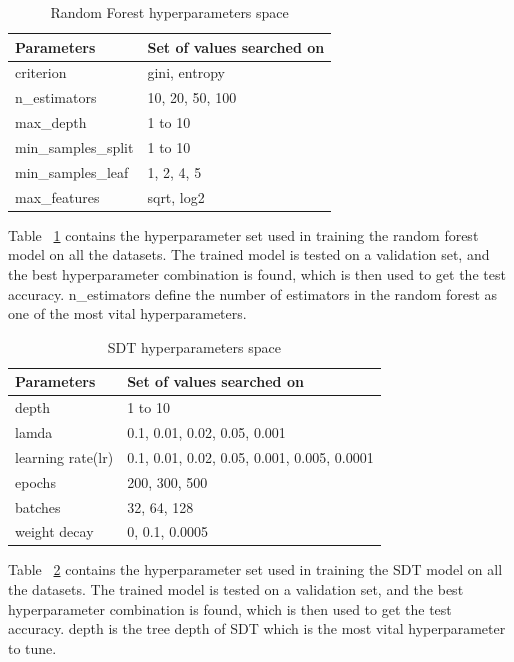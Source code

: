 \documentclass{article} %
\renewcommand{\>}{{\rightarrow}}
\renewcommand{\=}{\stackrel{\triangle}{=}}
\newcommand{\0}{{\mathbf 0}}
\begin{document}
\begin{table}[htbp]
\caption{Random Forest hyperparameters space}
\label{rf-hyp}
\begin{center}
\begin{tabular}{|p{4cm}|p{8cm}|}
\hline
Parameters &Set of values searched on\\
 \hline
criterion &gini, entropy\\
n\_estimators &10, 20, 50, 100\\
max\_depth &1 to 10\\
min\_samples\_split &1 to 10\\
min\_samples\_leaf &1, 2, 4, 5\\
max\_features &sqrt, log2\\
\hline 
\end{tabular}
\end{center}
\end{table}

Table ~\ref{rf-hyp} contains the hyperparameter set used in training the random forest model on all the datasets. The trained model is tested on a validation set, and the best hyperparameter combination is found, which is then used to get the test accuracy. n\_estimators define the number of estimators in the random forest as one of the most vital hyperparameters.

\begin{table}[htbp]
\caption{SDT hyperparameters space}
\label{sdt-hyp}
\begin{center}
\begin{tabular}{|p{4cm}|p{8cm}|}
\hline
Parameters &Set of values searched on\\
 \hline
depth &1 to 10\\
lamda &0.1, 0.01, 0.02, 0.05, 0.001\\
learning rate(lr)     &0.1, 0.01, 0.02, 0.05, 0.001, 0.005, 0.0001\\
epochs   &200, 300, 500\\
batches  &32, 64, 128\\
weight decay   &0, 0.1, 0.0005\\

\hline 
\end{tabular}
\end{center}
\end{table}

Table ~\ref{sdt-hyp} contains the hyperparameter set used in training the SDT model on all the datasets. The trained model is tested on a validation set, and the best hyperparameter combination is found, which is then used to get the test accuracy. depth is the tree depth of SDT which is the most vital hyperparameter to tune.
\end{document}

